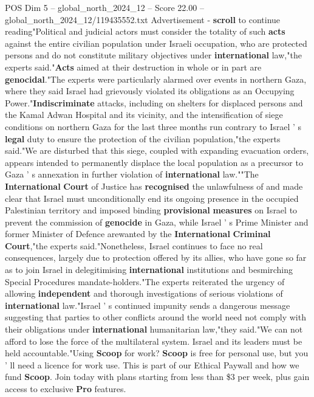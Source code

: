 \begin{textsample}{POS Dim 5 – global\_north\_2024\_12 – Score 22.00 – global\_north\_2024\_12/119435552.txt}
Advertisement - \textbf{scroll} to continue reading"Political and judicial actors must consider the totality of such \textbf{acts} against the entire civilian population under Israeli occupation, who are protected persons and do not constitute military objectives under \textbf{international} law,"the experts said."\textbf{Acts} aimed at their destruction in whole or in part are \textbf{genocidal}."The experts were particularly alarmed over events in northern Gaza, where they said Israel had grievously violated its obligations as an Occupying Power."\textbf{Indiscriminate} attacks, including on shelters for displaced persons and the Kamal Adwan Hospital and its vicinity, and the intensification of siege conditions on northern Gaza for the last three months run contrary to Israel ' s \textbf{legal} duty to ensure the protection of the civilian population,"the experts said."We are disturbed that this siege, coupled with expanding evacuation orders, appears intended to permanently displace the local population as a precursor to Gaza ' s annexation in further violation of \textbf{international} law.""The \textbf{International} \textbf{Court} of Justice has \textbf{recognised} the unlawfulness of and made clear that Israel must unconditionally end its ongoing presence in the occupied Palestinian territory and imposed binding \textbf{provisional} \textbf{measures} on Israel to prevent the commission of \textbf{genocide} in Gaza, while Israel ' s Prime Minister and former Minister of Defence arewanted by the \textbf{International} \textbf{Criminal} \textbf{Court},"the experts said."Nonetheless, Israel continues to face no real consequences, largely due to protection offered by its allies, who have gone so far as to join Israel in delegitimising \textbf{international} institutions and besmirching Special Procedures mandate-holders."The experts reiterated the urgency of allowing \textbf{independent} and thorough investigations of serious violations of \textbf{international} law."Israel ' s continued impunity sends a dangerous message suggesting that parties to other conflicts around the world need not comply with their obligations under \textbf{international} humanitarian law,"they said."We can not afford to lose the force of the multilateral system.
Israel and its leaders must be held accountable."Using \textbf{Scoop} for work? \textbf{Scoop} is free for personal use, but you ' ll need a licence for work use.
This is part of our Ethical Paywall and how we fund \textbf{Scoop}.
Join today with plans starting from less than \$3 per week, plus gain access to exclusive \textbf{Pro} features.

\end{textsample}
